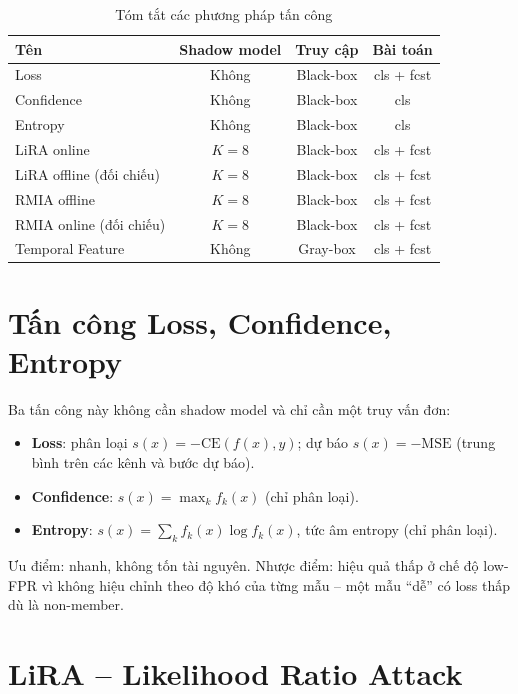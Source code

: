 \documentclass[12pt,a4paper]{report}
\begin{document}
\begin{table}[H]
\centering
\caption{Tóm tắt các phương pháp tấn công}
\label{tab:attacks_overview}
\begin{tabular}{lccc}
\toprule
\textbf{Tên} & \textbf{Shadow model} & \textbf{Truy cập} & \textbf{Bài toán} \\
\midrule
Loss                  & Không   & Black-box & cls + fcst \\
Confidence            & Không   & Black-box & cls \\
Entropy               & Không   & Black-box & cls \\
LiRA online           & $K = 8$ & Black-box & cls + fcst \\
LiRA offline (đối chiếu) & $K = 8$ & Black-box & cls + fcst \\
RMIA offline          & $K = 8$ & Black-box & cls + fcst \\
RMIA online (đối chiếu)  & $K = 8$ & Black-box & cls + fcst \\
Temporal Feature      & Không   & Gray-box  & cls + fcst \\
\bottomrule
\end{tabular}
\end{table}

\section{Tấn công Loss, Confidence, Entropy}

Ba tấn công này không cần shadow model và chỉ cần một truy vấn đơn:

\begin{itemize}
  \item \textbf{Loss}: phân loại $s(x) = -\mathrm{CE}(f(x), y)$; dự báo $s(x) = -\mathrm{MSE}$ (trung bình trên các kênh và bước dự báo).
  \item \textbf{Confidence}: $s(x) = \max_k f_k(x)$ (chỉ phân loại).
  \item \textbf{Entropy}: $s(x) = \sum_k f_k(x) \log f_k(x)$, tức âm entropy (chỉ phân loại).
\end{itemize}

Ưu điểm: nhanh, không tốn tài nguyên. Nhược điểm: hiệu quả thấp ở chế độ low-FPR vì không hiệu chỉnh theo độ khó của từng mẫu -- một mẫu ``dễ'' có loss thấp dù là non-member.

\section{LiRA -- Likelihood Ratio Attack}
\end{document}
